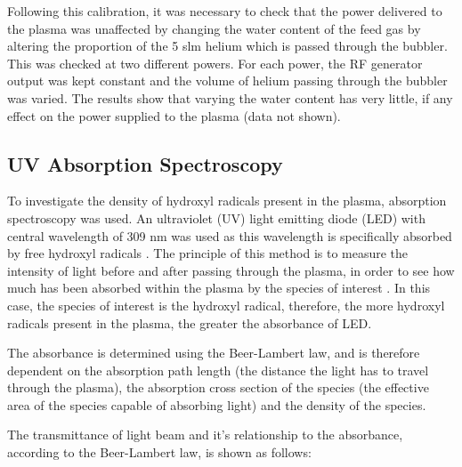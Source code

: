 \documentclass[11pt, oneside]{article}   	%
\begin{document}
Following this calibration, it was necessary to check that the power delivered to the plasma was unaffected by changing the water content of the feed gas by altering the proportion of the 5 slm helium which is passed through the bubbler.
This was checked at two different powers. 
For each power, the RF generator output was kept constant and the volume of helium passing through the bubbler was varied.
The results show that varying the water content has very little, if any effect on the power supplied to the plasma (data not shown).


\subsection{UV Absorption Spectroscopy} \label{sec:AbsorptionSpec}

To investigate the density of hydroxyl radicals present in the plasma, absorption spectroscopy was used. An ultraviolet (UV) light emitting diode (LED) with central wavelength of 309 nm was used as this wavelength is specifically absorbed by free hydroxyl radicals \cite{Hatano2010}.
The principle of this method is to measure the intensity of light before and after passing through the plasma, in order to see how much has been absorbed within the plasma by the species of interest \cite{Reuter2015}.
In this case, the species of interest is the hydroxyl radical, therefore, the more hydroxyl radicals present in the plasma, the greater the absorbance of LED.

The absorbance is determined using the Beer-Lambert law, and is therefore dependent on the absorption path length (the distance the light has to travel through the plasma), the absorption cross section of the species (the effective area of the species capable of absorbing light) and the density of the species.

The transmittance of light beam and it's relationship to the absorbance, according to the Beer-Lambert law, is shown as follows:
\end{document}
